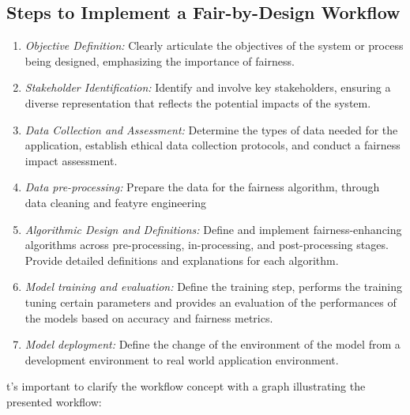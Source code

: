 \documentclass[12pt,a4paper,openright,twoside]{book}
\begin{document}
\subsection{Steps to Implement a Fair-by-Design Workflow}
\label{subsection:steps}

\begin{enumerate}

    \item \emph{Objective Definition:} Clearly articulate the objectives of the system or process being designed, emphasizing the importance of fairness.

    \item \emph{Stakeholder Identification:} Identify and involve key stakeholders, ensuring a diverse representation that reflects the potential impacts of the system.

    \item \emph{Data Collection and Assessment:} Determine the types of data needed for the application, establish ethical data collection protocols, and conduct a fairness impact assessment.

    \item \emph{Data pre-processing:} Prepare the data for the fairness algorithm, through data cleaning and featyre engineering
    
    \item \emph{Algorithmic Design and Definitions:} Define and implement fairness-enhancing algorithms across pre-processing, in-processing, and post-processing stages. Provide detailed definitions and explanations for each algorithm.

    \item \emph{Model training and evaluation:} Define the training step, performs the training tuning certain parameters and provides an evaluation of the performances of the models based on accuracy and fairness metrics.

    \item \emph{Model deployment:} Define the change of the environment of the model from a development environment to real world application environment.

\end{enumerate}

t's important to clarify the workflow concept with a graph illustrating the presented workflow:
\end{document}
